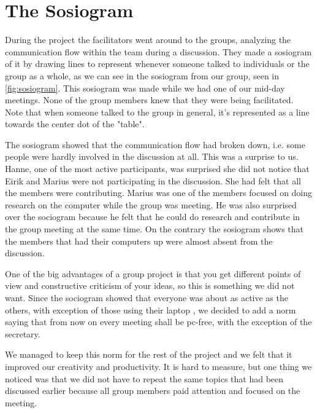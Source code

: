 \section{The Sosiogram}
During the project the facilitators went around to the groups, analyzing the communication flow within the team during a discussion. They made a sosiogram of it by drawing lines to represent whenever someone talked to individuals or the group as a whole, as we can see in the sosiogram from our group, seen in \autoref{fig:sosiogram}. This sosiogram was made while we had one of our mid-day meetings. None of the group members knew that they were being facilitated. Note that when someone talked to the group in general, it's represented as a line towards the center dot of the "table".

The sosiogram showed that the communication flow had broken down, i.e. some people were hardly involved in the discussion at all. This was a surprise to us. Hanne, one of the most active participants, was surprised she did not notice that Eirik and Marius were not participating in the discussion. She had felt that all the members were contributing. Marius was one of the members focused on doing research on the computer while the group was meeting. He was also surprised over the sociogram because he felt that he could do research and contribute in the group meeting at the same time. On the contrary the sosiogram shows that the members that had their computers up were almost absent from the discussion.

One of the big advantages of a group project is that you get different points of view and constructive criticism of your ideas, so this is something we did not want. Since the sociogram showed that everyone was about as active as the others, with exception of those using their laptop , we decided to add a norm saying that from now on every meeting shall be pc-free, with the exception of the secretary. 

We managed to keep this norm for the rest of the project and we felt that it improved our creativity and productivity. It is hard to measure, but one thing we noticed was that we did not have to repeat the same topics that had been discussed earlier because all group members paid attention and focused on the meeting. 


